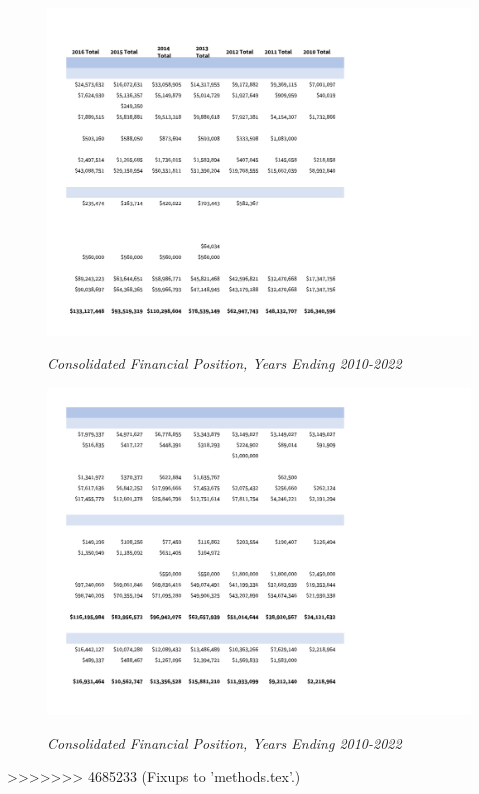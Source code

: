 \begin{figure}[hbt]
    \caption[Consolidated Financial Position, Years Ending 2010–2022]{\textit{Consolidated Financial Position, Years Ending 2010-2022}}\label{fig:consolidated_financial_position_2010-2022-3} %
    \includegraphics[width=\textwidth]{Consolidated_Financial_Statements/v5_Spreadsheets/Consolidated_Financial_Position_Years_2010-2022_PDF_pages/.pg_0003.pdf}\\ %
\end{figure}
\begin{figure}[hbt]
    \caption[Consolidated Financial Position, Years Ending 2010–2022]{\textit{Consolidated Financial Position, Years Ending 2010-2022}}\label{fig:consolidated_financial_position_2010-2022-4} %
    \includegraphics[width=\textwidth]{Consolidated_Financial_Statements/v5_Spreadsheets/Consolidated_Financial_Position_Years_2010-2022_PDF_pages/.pg_0004.pdf}\\ %
\end{figure}
>>>>>>> 4685233 (Fixups to 'methods.tex'.)

